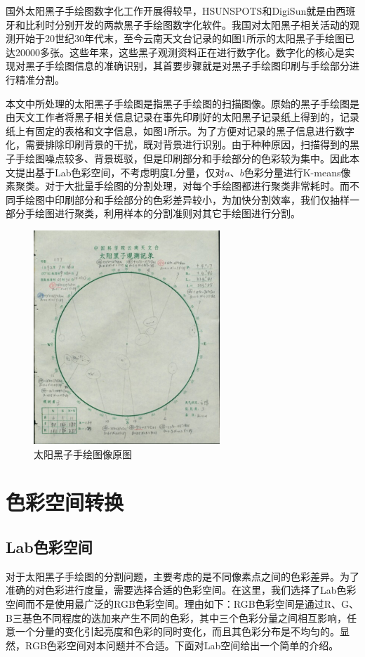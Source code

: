 \documentclass[UTF8,a4paper,twoside]{ctexart}
\begin{document}
国外太阳黑子手绘图数字化工作开展得较早，HSUNSPOTS和DigiSun就是由西班牙和比利时分别开发的两款黑子手绘图数字化软件。我国对太阳黑子相关活动的观测开始于20世纪30年代末，至今云南天文台记录的如图1所示的太阳黑子手绘图已达20000多张。这些年来，这些黑子观测资料正在进行数字化。数字化的核心是实现对黑子手绘图信息的准确识别，其首要步骤就是对黑子手绘图印刷与手绘部分进行精准分割。

本文中所处理的太阳黑子手绘图是指黑子手绘图的扫描图像。原始的黑子手绘图是由天文工作者将黑子相关信息记录在事先印刷好的太阳黑子记录纸上得到的，记录纸上有固定的表格和文字信息，如图1所示。为了方便对记录的黑子信息进行数字化，需要排除印刷背景的干扰，既对背景进行识别。由于种种原因，扫描得到的黑子手绘图噪点较多、背景斑驳，但是印刷部分和手绘部分的色彩较为集中。因此本文提出基于Lab色彩空间，不考虑明度L分量，仅对$a$、$b$色彩分量进行K-means像素聚类。对于大批量手绘图的分割处理，对每个手绘图都进行聚类非常耗时。而不同手绘图中印刷部分和手绘部分的色彩差异较小，为加快分割效率，我们仅抽样一部分手绘图进行聚类，利用样本的分割准则对其它手绘图进行分割。

\begin{figure}
  \centering
  \includegraphics[width=7cm]{fig01.png}
  \caption{太阳黑子手绘图像原图}
\end{figure}

\section{色彩空间转换}
\subsection{Lab色彩空间}
对于太阳黑子手绘图的分割问题，主要考虑的是不同像素点之间的色彩差异。为了准确的对色彩进行度量，需要选择合适的色彩空间。在这里，我们选择了Lab色彩空间而不是使用最广泛的RGB色彩空间。理由如下：RGB色彩空间是通过R、G、B三基色不同程度的迭加来产生不同的色彩，其中三个色彩分量之间相互影响，任意一个分量的变化引起亮度和色彩的同时变化，而且其色彩分布是不均匀的。显然，RGB色彩空间对本问题并不合适。下面对Lab空间给出一个简单的介绍。
\end{document}
